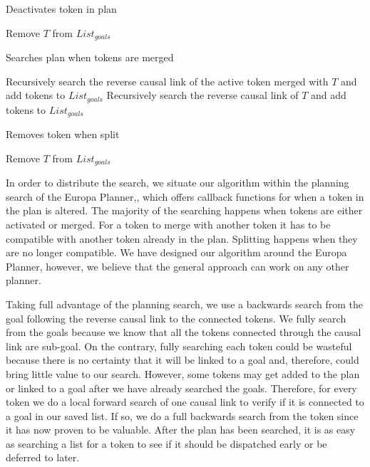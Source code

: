 \begin{algorithm}
\caption{Deactivates token in plan}
\label{NotifyDeactivated}
\begin{algorithmic}
	\State Remove $T$ from $List_{goals}$
\EndIf
\EndFunction
\end{algorithmic}
\end{algorithm}

\begin{algorithm}
\caption{Searches plan when tokens are merged}
\label{NotifyMerged}
\begin{algorithmic}
	\State Recursively search the reverse causal link of the active token merged with $T$ and add tokens to $List_{goals}$
	\State Recursively search the reverse causal link of $T$ and add tokens to $List_{goals}$
\EndIf
\EndFunction
\end{algorithmic}
\end{algorithm}

\begin{algorithm}
\caption{Removes token when split}
\label{NotifySplit}
\begin{algorithmic}
	\State Remove $T$ from $List_{goals}$
\EndIf
\EndFunction
\end{algorithmic}
\end{algorithm}

In order to distribute the search, we situate our algorithm within the
planning search of the Europa Planner,\cite{frank2003}, which offers 
callback functions for when a token in the plan is altered. The majority
of the searching happens when tokens are either activated or 
merged. For a token to merge with another token it has to be compatible with
another token already in the plan. Splitting happens when they are
no longer compatible. We have designed our algorithm around the
Europa Planner, however, we believe that the general approach
can work on any other planner. 

Taking full advantage of the planning search, we
use a backwards search from the goal following the reverse causal link
to the connected tokens.  We fully search from the goals because we
know that all the tokens connected through the causal link are
sub-goal.  On the contrary, fully searching each token could be
wasteful because there is no certainty that it will be linked to a
goal and, therefore, could bring little value to our search. However,
some tokens may get added to the plan or linked to a goal after we
have already searched the goals. Therefore, for every token we do a
local forward search of one causal link to verify if it is connected
to a goal in our saved list.  If so, we do a full backwards search
from the token since it has now proven to be valuable. After the plan
has been searched, it is as easy as searching a list for a token to
see if it should be dispatched early or be deferred to later.

